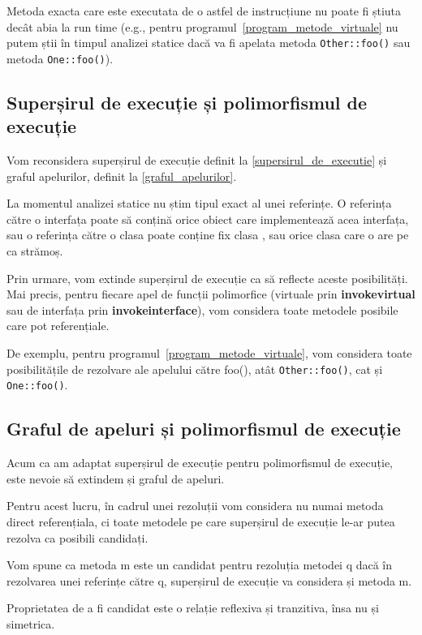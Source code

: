 Metoda exacta care este executata de o astfel de instrucțiune nu poate fi știuta
decât abia la run time (e.g., pentru programul~\ref{program_metode_virtuale}
nu putem știi în timpul analizei statice dacă va fi apelata metoda
\texttt{Other::foo()} sau metoda \texttt{One::foo()}).

\subsection{Superșirul de execuție și polimorfismul de execuție}

Vom reconsidera superșirul de execuție definit la \ref{supersirul_de_executie}
și graful apelurilor, definit la \ref{graful_apelurilor}.

La momentul analizei statice nu știm tipul exact al unei referințe.
O referința către o interfața poate să conțină orice obiect care implementează
acea interfața, sau o referința către o clasa  poate conține fix clasa
, sau orice clasa care o are pe  ca strămoș.

Prin urmare, vom extinde superșirul de execuție ca să reflecte aceste
posibilități.
Mai precis, pentru fiecare apel de funcții polimorfice (virtuale prin
\textbf{invokevirtual} sau de interfața prin \textbf{invokeinterface}), vom
considera toate metodele posibile care pot referențiale.

De exemplu, pentru programul~\ref{program_metode_virtuale}, vom considera toate
posibilitățile de rezolvare ale apelului către foo(), atât \texttt{Other::foo()},
cat și \texttt{One::foo()}.

\subsection{Graful de apeluri și polimorfismul de execuție}

Acum ca am adaptat superșirul de execuție pentru polimorfismul de execuție, este
nevoie să extindem și graful de apeluri.

Pentru acest lucru, în cadrul unei rezoluții vom considera nu numai metoda
direct referențiala, ci toate metodele pe care superșirul de execuție le-ar
putea rezolva ca posibili candidați.

Vom spune ca metoda m este un candidat pentru rezoluția metodei q dacă în
rezolvarea unei referințe către q, superșirul de execuție va considera și metoda
m.

Proprietatea de a fi candidat este o relație reflexiva și tranzitiva, însa nu și
simetrica.

